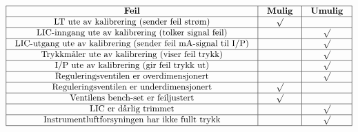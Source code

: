 

$$\vbox{\offinterlineskip
\halign{\strut
\vrule \quad\hfil # \ \hfil & 
\vrule \quad\hfil # \ \hfil & 
\vrule \quad\hfil # \ \hfil \vrule \cr
\noalign{\hrule}
%
{\bf Feil} & {\bf Mulig} & {\bf Umulig} \cr
%
\noalign{\hrule}
%
LT ute av kalibrering (sender feil strøm) & $\surd$ &  \cr
%
\noalign{\hrule}
%
LIC-inngang ute av kalibrering (tolker signal feil) &  & $\surd$ \cr
%
\noalign{\hrule}
%
LIC-utgang ute av kalibrering (sender feil mA-signal til I/P) &  & $\surd$ \cr
%
\noalign{\hrule}
%
Trykkmåler ute av kalibrering (viser feil trykk) &  & $\surd$ \cr
%
\noalign{\hrule}
%
I/P ute av kalibrering (gir feil trykk ut) &  & $\surd$ \cr
%
\noalign{\hrule}
%
Reguleringsventilen er overdimensjonert &  & $\surd$ \cr
%
\noalign{\hrule}
%
Reguleringsventilen er underdimensjonert & $\surd$ &  \cr
%
\noalign{\hrule}
%
Ventilens bench-set er feiljustert & $\surd$ &  \cr
%
\noalign{\hrule}
%
LIC er dårlig trimmet &  & $\surd$ \cr
%
\noalign{\hrule}
%
Instrumentluftforsyningen har ikke fullt trykk &  & $\surd$ \cr
%
\noalign{\hrule}
} %
}$$ %









